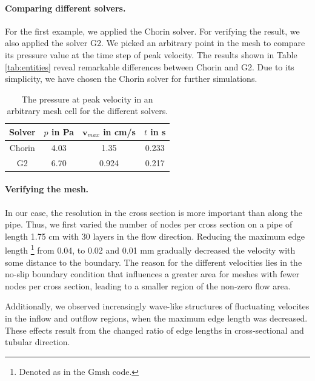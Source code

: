 \paragraph{Comparing different solvers.}
For the first example, we applied the Chorin solver. For verifying the result, we also
applied the solver G2. We picked an arbitrary point in the
mesh to compare its pressure value at the time step of peak
velocity. The results shown in Table \ref{tab:entities} reveal
remarkable differences between Chorin and G2. Due to its simplicity,
we have chosen the Chorin solver for further
simulations.

\begin{table}\begin{center}
    \begin{tabular}{ | c | c | c | c |}
    \hline
    Solver & $p$ in Pa & $\mathbf{v}_{max}$ in cm/s  & $t$ in s \\ \hline\hline
	Chorin & 4.03 & 1.35 & 0.233 	\\ \hline
	G2	& 6.70 & 0.924 & 0.217	\\ \hline
    \hline
    \end{tabular}
	\label{tab:solvers}
	\caption{The pressure at peak velocity in an arbitrary mesh cell for the different solvers.}
\end{center}\end{table}


\paragraph{Verifying the mesh.}
In our case, the resolution in the cross section is more important than along the pipe. Thus, we first varied the number of nodes per cross section on a pipe of length 1.75 cm with 30 layers in the flow direction. Reducing the maximum edge length \footnote{Denoted as  in the Gmsh code.} from 0.04, to 0.02 and 0.01 mm gradually decreased the velocity with some distance to the boundary. The reason for the different velocities lies in the no-slip boundary condition that influences a greater area for meshes with fewer nodes per cross section, leading to a smaller region of the non-zero flow area.

Additionally, we observed increasingly wave-like structures of fluctuating velocites in the inflow and outflow regions, when the maximum edge length was decreased. These effects result from the changed ratio of edge lengths in cross-sectional and tubular direction.\\

